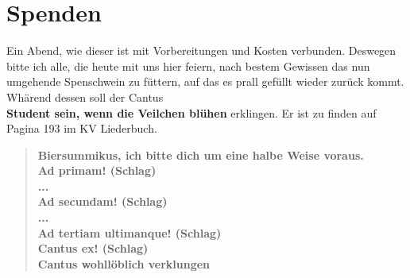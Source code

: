 \newpage
\section{Spenden}
Ein Abend, wie dieser ist mit Vorbereitungen und Kosten verbunden. Deswegen bitte ich
alle, die heute mit uns hier feiern, nach bestem Gewissen das nun umgehende Spenschwein
zu füttern, auf das es prall gefüllt wieder zurück kommt. Whärend dessen soll der Cantus\\
\textbf{Student sein, wenn die Veilchen blühen} erklingen. Er ist zu finden auf Pagina
193 im KV Liederbuch.
\begin{quote}
    \textbf{Biersummikus, ich bitte dich um eine halbe Weise voraus.\\
    Ad primam! (Schlag)\\
    ...\\
    Ad secundam! (Schlag)\\
    ...\\
    Ad tertiam ultimanque! (Schlag)\\
    Cantus ex! (Schlag)\\
    Cantus wohllöblich verklungen
    }
\end{quote}